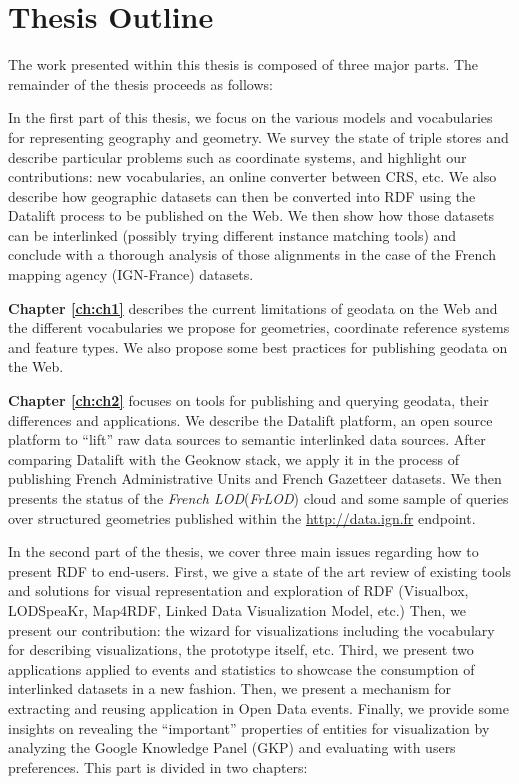 \section{Thesis Outline}
\label{sec:thesis-structure}
The work presented within this thesis is composed of three major parts. The remainder of the thesis proceeds as follows:

In the first part of this thesis, we focus on the various models and vocabularies for representing geography and geometry. We survey the state of triple stores and describe particular problems such as coordinate systems, and highlight our contributions: new vocabularies, an online converter between CRS, etc. We also describe how geographic datasets can then be converted into RDF using the Datalift process to be published on the Web. We then show how those datasets can be interlinked (possibly trying different instance matching tools) and  conclude with a thorough analysis of those alignments in the case of the French mapping agency (IGN-France) datasets.

\textbf{Chapter \ref{ch:ch1}} describes the current limitations of geodata on the Web and the different vocabularies we propose for geometries, coordinate reference systems and feature  types. We also propose  some best practices for publishing geodata on the Web.

\textbf{Chapter \ref{ch:ch2}} focuses on tools for publishing and querying geodata, their differences and applications. We describe the Datalift platform, an open source platform to ``lift'' raw data sources to semantic interlinked data sources. After comparing Datalift with the Geoknow stack, we apply it in the process of publishing French Administrative Units and French Gazetteer datasets. We then presents the status of the \textit{French LOD}(\textit{FrLOD}) cloud and some sample of queries over structured geometries published within the \url{http://data.ign.fr} endpoint.

In the second part of the thesis, we cover three main issues regarding how to present RDF to end-users. First, we give a state of the art review of existing tools and solutions for visual representation and exploration of RDF (Visualbox, LODSpeaKr, Map4RDF, Linked Data Visualization Model, etc.) Then, we present our contribution: the wizard for visualizations including the vocabulary for describing visualizations, the prototype itself, etc. Third, we present two applications applied to events and statistics to showcase the consumption of interlinked datasets in a new fashion. Then, we present a mechanism for extracting and reusing application in Open Data events. Finally, we provide some insights on revealing the ``important'' properties of entities for visualization by analyzing the Google Knowledge Panel (GKP) and evaluating with users preferences. This part is divided in two chapters:

